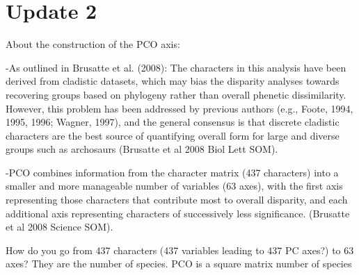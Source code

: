 \documentclass[a4paper,11pt]{article}
\begin{document}
\section{Update 2}
About the construction of the PCO axis:

-As outlined in Brusatte et al. (2008): The characters in this analysis have been derived from cladistic datasets, which may bias the disparity analyses towards recovering groups based on phylogeny rather than overall phenetic dissimilarity. However, this problem has been addressed by previous authors (e.g., Foote, 1994, 1995, 1996; Wagner, 1997), and the general consensus is that discrete cladistic characters are the best source of quantifying overall form for large and diverse groups such as archosaurs (Brusatte et al 2008 Biol Lett SOM).

-PCO combines information from the character matrix (437 characters) into a smaller and more manageable number of variables (63 axes), with the first axis representing those characters that contribute most to overall disparity, and each additional axis representing characters of successively less significance. (Brusatte et al 2008 Science SOM).

How do you go from 437 characters (437 variables leading to 437 PC axes?) to 63 axes? They are the number of species. PCO is a square matrix number of species 




\end{document}

